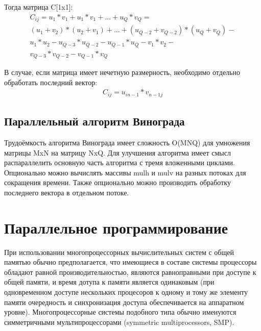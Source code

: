 \documentclass[a4paper,12pt]{report}
\begin{document}
        	\vspace{0.3cm}
        	Тогда матрица C[1x1]:\\
        	\begin{multline}
        		\label{func:vinograd}
        		C_{ij} = u_{1}*v_{1}+u_{1}*v_{1}+...+u_{Q}*v_{Q} =\\ (u_{1}+v_{2})*(u_{2}+v_{1})+...+(u_{Q-2}+v_{Q-2})*(u_{Q}+v_{Q})-\\
        		u_{1}*u_{2}-u_{Q-3}*u_{Q-2}-u_{Q-1}*u_{Q}-v_{1}*v_{2}-\\
        		v_{Q-3}*v_{Q-2}-v_{Q-1}*v_{Q}
        	\end{multline}
        	
        	В случае, если матрица имеет нечетную размерность, необходимо отдельно обработать последний вектор:
        	\begin{multline}
        		\label{func:vinograd_end}
        		C_{ij} = u_{in-1}*v_{n-1j}
        	\end{multline}

	\subsection{Параллельный алгоритм Винограда}
  
    		Трудоёмкость алгоритма Винограда имеет сложность O(MNQ) для умножения матрицы MxN на матрицу NxQ. 
    		Для улучшения алгоритма имеет смысл распараллелить основную часть алгоритма с тремя вложенными циклами. 
    		Опционально можно вычислять массивы mulh и mulv на разных потоках для сокращения времени. 
    		Также опционально можно производить обработку последнего вектора в отдельном потоке. 

	\section{Параллельное программирование}

    		При использовании многопроцессорных вычислительных систем с общей памятью обычно предполагается, что имеющиеся в составе системы процессоры обладают равной производительностью, являются равноправными при доступе к общей памяти, и время дотупа к памяти является одинаковым (при одновременном доступе нескольких процесоров к одному и тому же элементу памяти очередность и синхронизация доступа обеспечивается на аппаратном уровне).
    		Многопроцессорные системы подобного типа обычно именуются симметричными мультипроцессорами (symmetric multiprocessors, SMP).
    		
\end{document}

